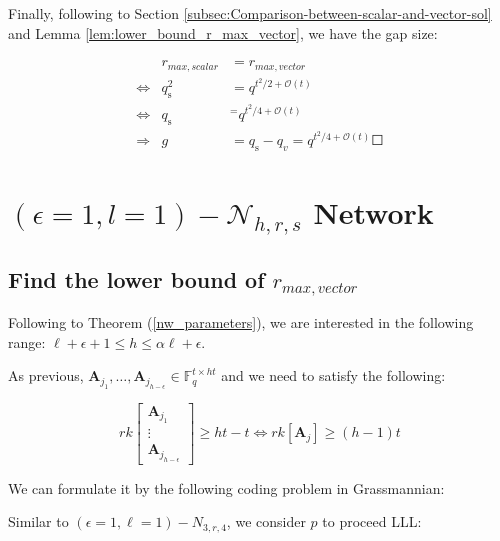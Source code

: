 Finally, following to Section \ref{subsec:Comparison-between-scalar-and-vector-sol}
and Lemma \ref{lem:lower_bound_r_max_vector}, we have the gap size:

\begin{eqnarray}
 & r_{max,scalar} & =r_{max,vector}\nonumber \\
\Leftrightarrow & q_{\mathrm{s}}^{2} & =q^{t^{2}/2+\mathcal{O}(t)}\nonumber \\
\Leftrightarrow & q_{\mathrm{s}} & ^{=}q^{t^{2}/4+\mathcal{O}(t)}\nonumber \\
\Rightarrow & g & =q_{\mathrm{s}}-q_{v}=q^{t^{2}/4+\mathcal{O}(t)}\Square\label{eq:gap_e1l1h3rs4}
\end{eqnarray}


\section{$\left(\epsilon=1,l=1\right)-\mathcal{N}_{h,r,s}$ Network}

\subsection{Find the lower bound of $r_{max,vector}$}

Following to Theorem (\ref{nw_parameters}), we are interested in
the following range: $\ell+\epsilon+1\leq h\leq\alpha\ell+\epsilon$.

As previous, $\boldsymbol{A}_{j_{1}},\ldots,\boldsymbol{A}_{j_{h-\epsilon}}\in\ensuremath{\mathbb{F}}_{q}^{t\times ht}$
and we need to satisfy the following:

\[
rk\left[\begin{array}{c}
\boldsymbol{A}_{j_{1}}\\
\vdots\\
\boldsymbol{A}_{j_{h-\epsilon}}
\end{array}\right]\geq ht-t\Leftrightarrow rk\left[\boldsymbol{A}_{j}\right]\geq(h-1)t
\]

We can formulate it by the following coding problem in Grassmannian:

\noindent{}

Similar to $\left(\epsilon=1,\ell=1\right)-\ensuremath{N}_{3,r,4}$,
we consider $p$ to proceed LLL:

